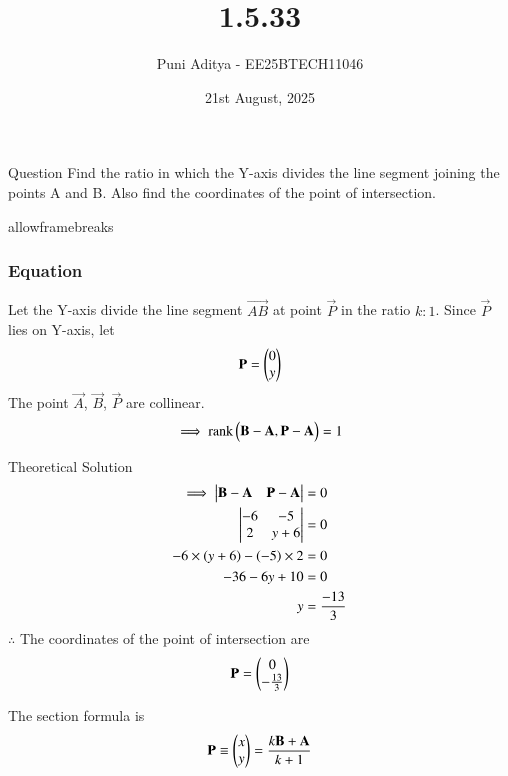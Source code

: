 \documentclass{beamer}
\title{1.5.33}
\date{21st August, 2025}
\author{Puni Aditya - EE25BTECH11046}
\begin{document}
\frame{\titlepage}
\begin{frame}{Question}
Find the ratio in which the Y-axis divides the line segment joining the points A and B. Also find the coordinates of the point of intersection.
\end{frame}

\begin{frame}{allowframebreaks}
\frametitle{Equation}
Let the Y-axis divide the line segment $\vec{AB}$ at point $\vec{P}$ in the ratio $k:1$.
Since $\vec{P}$ lies on Y-axis, let
\begin{align*}
\mathbf{P} = \begin{pmatrix}0 \\ y\end{pmatrix}
\end{align*}
The point $\vec{A}$, $\vec{B}$, $\vec{P}$ are collinear.
\begin{align}
\implies \text{rank}\begin{pmatrix}\mathbf{B}-\mathbf{A} , \mathbf{P}-\mathbf{A}\end{pmatrix} = 1
\end{align}
\end{frame}

\begin{frame}{Theoretical Solution}
\begin{align}
\implies \begin{vmatrix}\mathbf{B}-\mathbf{A} & \mathbf{P}-\mathbf{A}\end{vmatrix} &= 0 \\
\begin{vmatrix}-6 & -5 \\ 2 & y+6\end{vmatrix} &= 0 \\
-6 \times \left(y+6\right) - \left(-5\right) \times 2 &= 0 \\
-36 - 6y + 10 &= 0 \\
y &= \frac{-13}{3}
\end{align}
$\therefore$ The coordinates of the point of intersection are 
\begin{align*}
\mathbf{P} = \begin{pmatrix}0 \\ -\frac{13}{3}\end{pmatrix}
\end{align*}

The section formula is
\begin{align}
    \mathbf{P} \equiv \begin{pmatrix}x \\ y\end{pmatrix} = \frac{k\mathbf{B} + \mathbf{A}}{k+1}
\end{align}
\end{frame}
\end{document}
